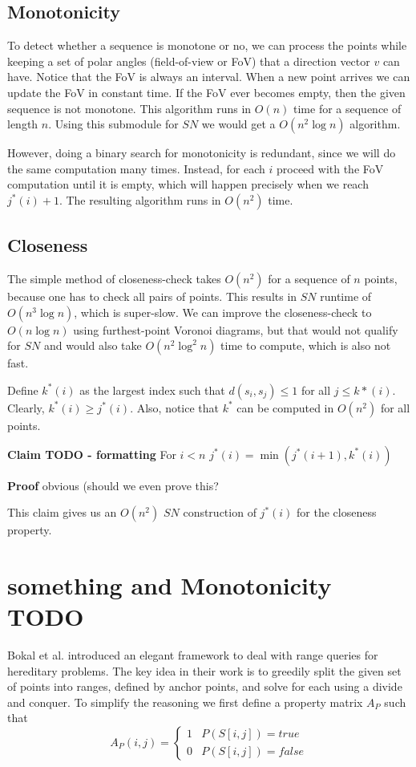\documentclass{article}
\newcommand{\twopartdef}[4]
{
    \left\{
    \begin{array}{ll}
        #1 & #2 \\
        #3 & #4
    \end{array}
    \right.
}
\begin{document}
\subsection{Monotonicity}
To detect whether a sequence is monotone or no, we can process the points while keeping a set of polar angles (field-of-view or FoV) that a direction vector $v$ can have. Notice that the FoV is always an interval. When a new point arrives we can update the FoV in constant time. If the FoV ever becomes empty, then the given sequence is not monotone. This algorithm runs in $O(n)$ time for a sequence of length $n$. Using this submodule for $SN$ we would get a $O(n^2\log n)$ algorithm.

However, doing a binary search for monotonicity is redundant, since we will do the same computation many times. Instead, for each $i$ proceed with the FoV computation until it is empty, which will happen precisely when we reach $j^*(i) + 1$. The resulting algorithm runs in $O(n^2)$ time.

\subsection{Closeness}
The simple method of closeness-check takes $O(n^2)$ for a sequence of $n$ points, because one has to check all pairs of points. This results in $SN$ runtime of $O(n^3\log n)$, which is super-slow. We can improve the closeness-check to $O(n\log n)$ using furthest-point Voronoi diagrams, but that would not qualify for $SN$ and would also take $O(n^2 \log^2 n)$ time to compute, which is also not fast.

Define $k^*(i)$ as the largest index such that $d(s_i, s_j) \leq 1$ for all $j \leq k*(i)$. Clearly, $k^*(i) \geq j^*(i)$. Also, notice that $k^*$ can be computed in $O(n^2)$ for all points.

\textbf{Claim TODO - formatting} For $i < n$ $j^*(i) = \min( j^*(i + 1), k^*(i) )$

\textbf{Proof} obvious (should we even prove this?

This claim gives us an $O(n^2)$ $SN$ construction of $j^*(i)$ for the closeness property.

\section{something and Monotonicity TODO}
\label{sec:monotonicity}
Bokal et al. introduced an elegant framework to deal with range queries for hereditary problems. The key idea in their work is to greedily split the given set of points into ranges, defined by anchor points, and solve for each using a divide and conquer. To simplify the reasoning we first define a property matrix $A_P$ such that
\[ A_P(i, j) = \twopartdef{1}{P(S[i, j]) = true}{0}{P(S[i, j]) = false} \]
\end{document}
